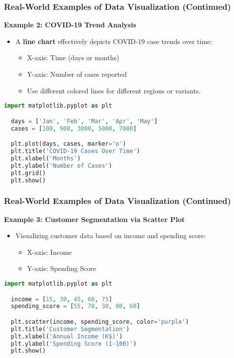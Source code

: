 \documentclass[aspectratio=169]{beamer}
\begin{document}
\begin{frame}[fragile]
  \frametitle{Real-World Examples of Data Visualization (Continued)}

  \textbf{Example 2: COVID-19 Trend Analysis}
  \begin{itemize}
    \item A \textbf{line chart} effectively depicts COVID-19 case trends over time:
    \begin{itemize}
      \item X-axis: Time (days or months)
      \item Y-axis: Number of cases reported
      \item Use different colored lines for different regions or variants.
    \end{itemize}
  \end{itemize}

  \begin{lstlisting}[language=Python]
  import matplotlib.pyplot as plt

  days = ['Jan', 'Feb', 'Mar', 'Apr', 'May']
  cases = [100, 900, 3000, 5000, 7000]

  plt.plot(days, cases, marker='o')
  plt.title('COVID-19 Cases Over Time')
  plt.xlabel('Months')
  plt.ylabel('Number of Cases')
  plt.grid()
  plt.show()
  \end{lstlisting}
  
\end{frame}

\begin{frame}[fragile]
  \frametitle{Real-World Examples of Data Visualization (Continued)}

  \textbf{Example 3: Customer Segmentation via Scatter Plot}
  \begin{itemize}
    \item Visualizing customer data based on income and spending score:
    \begin{itemize}
      \item X-axis: Income
      \item Y-axis: Spending Score
    \end{itemize}
  \end{itemize}

  \begin{lstlisting}[language=Python]
  import matplotlib.pyplot as plt

  income = [15, 30, 45, 60, 75]
  spending_score = [55, 70, 30, 80, 60]

  plt.scatter(income, spending_score, color='purple')
  plt.title('Customer Segmentation')
  plt.xlabel('Annual Income (K$)')
  plt.ylabel('Spending Score (1-100)')
  plt.show()
  \end{lstlisting}
  
\end{frame}
\end{document}
